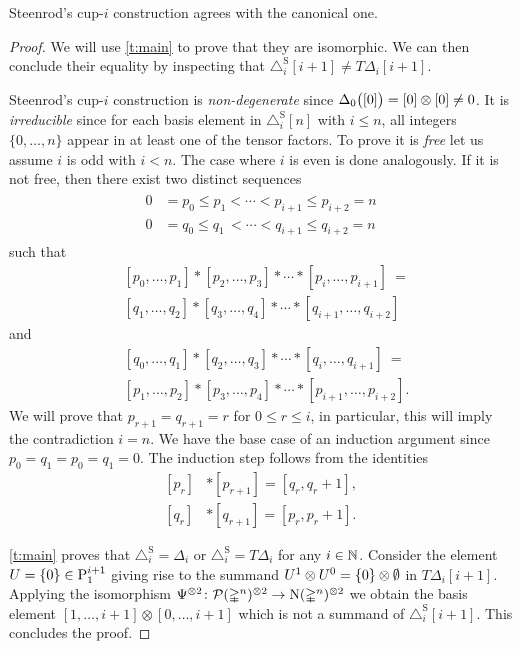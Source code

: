 \begin{theorem}\label{t:steenrod cup-i}
	Steenrod's \mbox{cup-$i$} construction agrees with the canonical one.
\end{theorem}

\begin{proof}
	We will use \cref{t:main} to prove that they are isomorphic.
	We can then conclude their equality by inspecting that $\triangle^{\mathrm{S}}_i [i+1] \neq T \Delta_i [i+1]$.

	Steenrod's \mbox{cup-$i$} construction is \emph{non-degenerate} since $\Delta_0\big([0]\big) = [0] \otimes [0] \neq 0$.
	It is \emph{irreducible} since for each basis element in $\triangle^{\mathrm{S}}_i [n]$ with $i \leq n$, all integers $\{0, \dots, n\}$ appear in at least one of the tensor factors.
	To prove it is \emph{free} let us assume $i$ is odd with $i < n$.
	The case where $i$ is even is done analogously.
	If it is not free, then there exist two distinct sequences
	\begin{align*}
	\begin{split}
	0 &= p_0 \leq p_1 < \cdots < p_{i+1} \leq p_{i+2} = n \\
	0 &= q_0 \leq q_1 \,< \cdots < q_{i+1} \leq q_{i+2} = n
	\end{split}
	\end{align*}
	such that
	\[
	\begin{split}
	&[ {p_0}, \dots, {p_1} ] \ast [ {p_2}, \dots, {p_3} ] \ast \cdots \ast [ {p_{i}}, \dots, {p_{i+1}} ]\ = \\
	&[ {q_1}, \dots, {q_2} ] \ast [ {q_3}, \dots, {q_4} ] \ast \cdots \ast [ {q_{i+1}}, \dots, {q_{i+2}} ]
	\end{split}
	\]
	and
	\[
	\begin{split}
	&[ {q_0}, \dots, {q_1} ] \ast [ {q_2}, \dots, {q_3} ] \ast \cdots \ast [ {q_{i}}, \dots, {q_{i+1}} ]\ = \\
	&[ {p_1}, \dots, {p_2} ] \ast [ {p_3}, \dots, {p_4} ] \ast \cdots \ast [ {p_{i+1}}, \dots, {p_{i+2}} ].
	\end{split}
	\]
	We will prove that $p_{r+1} = q_{r+1} = r$ for $0 \leq r \leq i$, in particular, this will imply the contradiction $i = n$.
	We have the base case of an induction argument since $p_0 = q_1 = p_0 = q_1 = 0$.
	The induction step follows from the identities
	\[
	\begin{split}
	[p_r] &\ast [p_{r+1}] = [q_r, q_{r}+1], \\
	[q_r] &\ast [q_{r+1}] = [p_r, p_{r}+1].
	\end{split}
	\]

	\cref{t:main} proves that $\triangle^{\mathrm{S}}_i = \Delta_i$ or $\triangle^{\mathrm{S}}_i = T \Delta_i$ for any $i \in \mathbb{N}$.
	Consider the element $U = \{0\} \in \mathrm{P}_{1}^{i+1}$ giving rise to the summand $U^1 \otimes U^0 = \{0\} \otimes \emptyset$ in $T \Delta_i [i+1]$.
	Applying the isomorphism $\Psi^{\otimes 2} \colon \mathcal{P}(\mathbb{\Delta}^n)^{\otimes 2} \to \operatorname{N}(\mathbb{\Delta}^n)^{\otimes 2}$ we obtain the basis element $[1,\dots,i+1] \otimes [0,\dots,i+1]$ which is not a summand of $\triangle^{\mathrm{S}}_i [i+1]$.
	This concludes the proof.
\end{proof}

